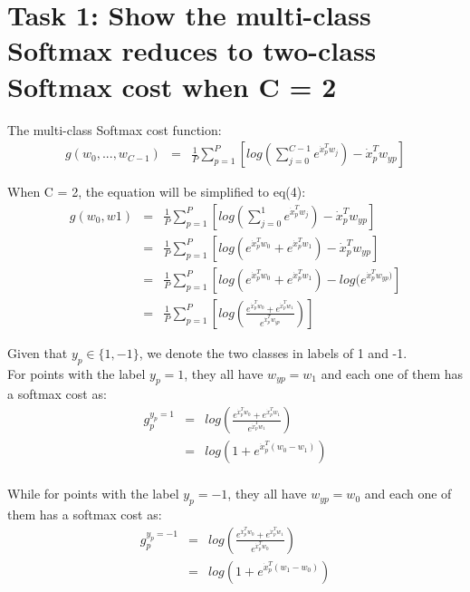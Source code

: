 \setlength\intextsep{1mm}

\section*{\textbf{Task 1: Show the multi-class Softmax reduces to two-class Softmax cost when C = 2}}

The multi-class Softmax cost function: 
\begin{eqnarray}
    g(w_0, ..., w_{C-1}) &=& \frac{1}{P} \sum_{p=1}^{P} [ log ( \sum_{j=0}^{C-1} e^{\dot{x}_p^T w_j} ) - \dot{x}_p^T w_{{yp}}]
\end{eqnarray}


When C = 2, the equation will be simplified to eq(4):
\begin{eqnarray}
    g(w_0, w1) &=& \frac{1}{P} \sum_{p=1}^{P} [ log ( \sum_{j=0}^{1} e^{\dot{x}_p^T w_j} ) - \dot{x}_p^T w_{{yp}}] \\
    &=& \frac{1}{P} \sum_{p=1}^{P} [ log ( e^{\dot{x}_p^T w_0} + e^{\dot{x}_p^T w_1}) - \dot{x}_p^T w_{yp}] \\
    &=& \frac{1}{P} \sum_{p=1}^{P} [ log ( e^{\dot{x}_p^T w_0} + e^{\dot{x}_p^T w_1}) - log (e^{\dot{x}_p^T w_{yp})}] \\
    &=& \frac{1}{P} \sum_{p=1}^{P} [ log ( \frac{ e^{\dot{x}_p^T w_0} + e^{\dot{x}_p^T w_1}}{e^{\dot{x}_p^T w_{yp}}} ) ] 
\end{eqnarray}

Given that $y_p \in \{1, -1\}$, we denote the two classes in labels of 1 and -1.\\
\quad For points with the label $y_p = 1$, they all have $w_{{yp}} = w_1$ and each one of them has a softmax cost as:
\begin{eqnarray}
    g_p^{y_p=1} &=& log (\frac{ e^{\dot{x}_p^T w_0} + e^{\dot{x}_p^T w_1}}{e^{\dot{x}_p^T w_1}}) \\
    &=& log (1 + e^{\dot{x}_p^T (w_0-w_1)}) \\
\end{eqnarray}

While for points with the label $y_p = -1$, they all have $w_{{yp}} = w_0$ and each one of them has a softmax cost as:
\begin{eqnarray}
    g_p^{y_p=-1} &=& log (\frac{ e^{\dot{x}_p^T w_0} + e^{\dot{x}_p^T w_1}}{e^{\dot{x}_p^T w_0}}) \\
    &=& log (1 + e^{\dot{x}_p^T (w_1-w_0)}) \\
\end{eqnarray}

